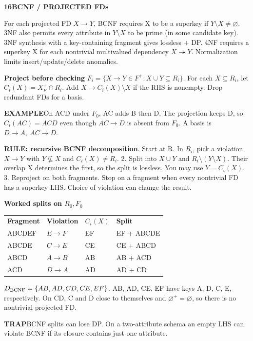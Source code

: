 \documentclass[a4paper]{article}
\newcommand{\bodyfontsize}{5.55}
\newcommand{\bodyleading}{5.3}
\newcommand{\bodylineskiplimit}{-2pt}
\newcommand{\bodystyle}{%
  \fontsize{\bodyfontsize}{\bodyleading}\selectfont\setlength{\lineskiplimit}{\bodylineskiplimit}\RaggedRight
  \setlength{\abovedisplayskip}{.5pt}\setlength{\belowdisplayskip}{.5pt}%
  \setlength{\abovedisplayshortskip}{.3pt}\setlength{\belowdisplayshortskip}{.3pt}}
\newcommand{\topic}[2]{\par\addvspace{.45pt}\nointerlineskip%
  \begingroup\setlength{\fboxsep}{0.35pt}%
  \noindent\colorbox{structure}{\parbox{\dimexpr\linewidth-2\fboxsep\relax}{%
    \color{white}\fontsize{6.45}{6.8}\selectfont\bfseries #1\enspace #2}}%
  \endgroup\par\nobreak\vspace{.55pt}\nointerlineskip\nobreak}
\newenvironment{topicblock}
  {\par\bodystyle}
  {\par}
\newcommand{\key}[1]{\par\textcolor{structure}{\textbf{#1}}\enspace}
\newcommand{\note}[4]{\par\nointerlineskip\vspace{.25pt}\begingroup\setlength{\fboxsep}{0.1pt}%
  \noindent\colorbox{#1}{\parbox{\dimexpr\linewidth-2\fboxsep\relax}{%
    \RaggedRight\textcolor{#2}{\textbf{#3}}\enspace #4}}%
  \endgroup\par\nointerlineskip\vspace{.25pt}}
\newcommand{\trap}[1]{\note{warningbg}{warning}{TRAP}{#1}}
\newcommand{\ex}[1]{\note{examplebg}{example}{EXAMPLE}{#1}}
\newlength{\sheetwidth}
\newenvironment{sheetcolumns}[1]
  {\noindent\begin{minipage}[t]{#1\sheetwidth}\vspace{0pt}\bodystyle\ignorespaces}
  {\end{minipage}\par}
\begin{document}
\begin{sheetcolumns}{.267}
\begin{topicblock}
\topic{16}{BCNF / PROJECTED FDs}
For each projected FD $X\to Y$, BCNF requires X to be a superkey if $Y\setminus X\ne\varnothing$. 3NF also permits every attribute in $Y\setminus X$ to be prime (in some candidate key). 3NF synthesis with a key-containing fragment gives lossless + DP. 4NF requires a superkey X for each nontrivial multivalued dependency $X\twoheadrightarrow Y$. Normalization limits insert/update/delete anomalies.
\key{Project before checking}
$F_i=\{X\to Y\in F^+:X\cup Y\subseteq R_i\}$. For each $X\subseteq R_i$, let $C_i(X)=X_F^+\cap R_i$. Add $X\to C_i(X)\setminus X$ if the RHS is nonempty. Drop redundant FDs for a basis.
\ex{On ACD under $F_0$, AC adds B then D. The projection keeps D, so $C_i(AC)=ACD$ even though $AC\to D$ is absent from $F_0$. A basis is $D\to A,\ AC\to D$.}
\key{RULE: recursive BCNF decomposition}
1. Start at R. In $R_i$, pick a violation $X\to Y$ with $Y\not\subseteq X$ and $C_i(X)\ne R_i$.
2. Split into $X\cup Y$ and $R_i\setminus(Y\setminus X)$. Their overlap X determines the first, so the split is lossless. You may use $Y=C_i(X)$.
3. Reproject on both fragments. Stop on a fragment when every nontrivial FD has a superkey LHS. Choice of violation can change the result.
\key{Worked splits on $R_0,F_0$}
\par\begin{tabular}{@{}llll@{}}
\textbf{Fragment} & \textbf{Violation} & $C_i(X)$ & \textbf{Split}\\
ABCDEF & $E\to F$ & EF & EF + ABCDE\\
ABCDE & $C\to E$ & CE & CE + ABCD\\
ABCD & $A\to B$ & AB & AB + ACD\\
ACD & $D\to A$ & AD & AD + CD
\end{tabular}\par
$D_{\rm BCNF}=\{AB,AD,CD,CE,EF\}$. AB, AD, CE, EF have keys A, D, C, E, respectively. On CD, C and D close to themselves and $\varnothing^+=\varnothing$, so there is no nontrivial projected FD.
\trap{BCNF splits can lose DP. On a two-attribute schema an empty LHS can violate BCNF if its closure contains just one attribute.}
\end{topicblock}


\end{sheetcolumns}
\end{document}
